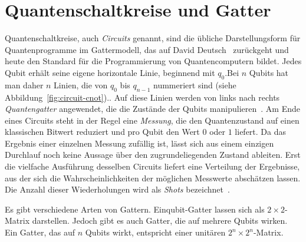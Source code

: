 \newpage
\section{Quantenschaltkreise und Gatter}
\label{sec:gatesCircuits}

Quantenschaltkreise, auch \textit{Circuits} genannt, sind die übliche Darstellungsform für Quantenprogramme im Gattermodell, das auf David Deutsch~\cite{deutsch1985quantum} zurückgeht und heute den Standard für die Programmierung von Quantencomputern bildet. Jedes Qubit erhält seine eigene horizontale Linie, beginnend mit $q_0$.Bei $n$ Qubits hat man daher $n$ Linien, die von $q_0$ bis $q_{n-1}$
nummeriert sind (siehe Abbildung~\ref{fig:circuit-cnot}).. Auf diese Linien werden von links nach rechts \textit{Quantengatter} angewendet, die die Zustände der Qubits manipulieren~\cite{nielsen2010chuang,homeister2022quantum}.
Am Ende eines Circuits steht in der Regel eine \textit{Messung}, die den Quantenzustand auf einen klassischen Bitwert reduziert und pro Qubit den Wert $0$ oder $1$ liefert. Da das Ergebnis einer einzelnen Messung zufällig ist, lässt sich aus einem einzigen Durchlauf noch keine Aussage über den zugrundeliegenden Zustand ableiten. Erst die vielfache Ausführung desselben Circuits liefert eine Verteilung der Ergebnisse, aus der sich die Wahrscheinlichkeiten der möglichen Messwerte abschätzen lassen. Die Anzahl dieser Wiederholungen wird als \textit{Shots} bezeichnet~\cite{nielsen2010chuang,bashiri2025quantencomputing}.

Es gibt verschiedene Arten von Gattern. Einqubit-Gatter lassen sich als $2 \times 2$-Matrix darstellen. Jedoch gibt es auch Gatter, die auf mehrere Qubits wirken. Ein Gatter, das auf $n$ Qubits wirkt, entspricht einer unitären $2^{n} \times 2^{n}$-Matrix.
\newpage


